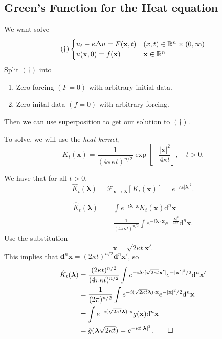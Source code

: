 \documentclass{article}
\begin{document}
\subsection{Green's Function for the Heat equation}
We want solve
\[
	(\dagger)\begin{cases}
		u_t-\kappa\Delta u =F(\mathbf x,t) & (x,t)\in \mathbb{R}^n\times (0,\infty)\\
		u(\mathbf x,0)=f(\mathbf x) & \mathbf x\in \mathbb{R}^n
	\end{cases}
\]
Split $ (\dagger) $ into 
\begin{enumerate}
	\item Zero forcing $ (F=0) $ with arbitrary initial data.
	\item Zero inital data $ (f=0) $ with arbitrary forcing.
\end{enumerate}
Then we can use superposition to get our solution to $ (\dagger) $.\par
To solve, we will use the \textit{heat kernel},
\[
	K_t(\mathbf x)=\frac{1}{(4\pi\kappa t)^{n/2}}\exp\left[-\frac{|\mathbf x|^2}{4\kappa t}\right],\quad t>0.
\]
\begin{proposition}
	We have that for all $ t >0 $,
  \[
	  \hat K_t(\boldsymbol \lambda)=\mathcal F_{\mathbf x\to\boldsymbol \lambda}[K_t(\mathbf x)]=e^{-\kappa t|\boldsymbol \lambda|^2}.
  \]
\end{proposition}
\pf \begin{align*}
	\hat K_t(\boldsymbol \lambda)&=\int e^{-i\boldsymbol \lambda\cdot\mathbf x}K_t(\mathbf x)\mathrm d^n\mathbf x \\
				     &= \frac 1{(4\pi \kappa t)^{n/2}}\int e^{-i\boldsymbol\lambda\cdot\mathbf x}e^{-\frac{|\mathbf x|^2}{4\kappa t}}\mathrm d^n\mathbf x.
\end{align*}
Use the substitution
\[
	\mathbf x=\sqrt{2\kappa t}\mathbf x'.
\]
This implies that $ \mathbf d^n\mathbf x = (2\kappa t)^{n/2} \mathbf d^n\mathbf x' $, so
\begin{align*}
	\hat K_t(\boldsymbol \lambda)&=\frac{(2\kappa t)^{n/2}}{(4\pi \kappa t)^{n/2}}\int e^{-i\boldsymbol \lambda \cdot [\sqrt{2\kappa t} \mathbf x']}e^{-|\mathbf x'|^2/2}\mathrm d^n\mathbf x'\\
				     &=\frac 1{(2\pi)^{n/2}}\int e^{-i(\sqrt{2\kappa t}\boldsymbol \lambda)\cdot \mathbf x}e^{-|\mathbf x|^2/2}\mathrm d^n\mathbf x\\
				     &=\int e^{-i(\sqrt{2\kappa t}\boldsymbol\lambda)\cdot \mathbf x}g(\mathbf x)\mathrm d^n\mathbf x\\
				     &=\hat g(\boldsymbol \lambda\sqrt{2\kappa t})=e^{-\kappa t |\boldsymbol \lambda|^2}.\qed
\end{align*}
\end{document}
